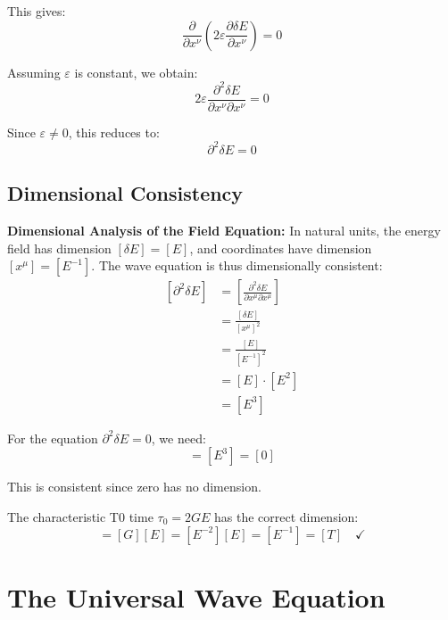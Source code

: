 \documentclass[12pt,a4paper]{report}
\begin{document}
This gives:
\begin{equation}
	\frac{\partial}{\partial x^\nu}\left(2\varepsilon \frac{\partial \delta E}{\partial x^\nu}\right) = 0
\end{equation}

Assuming $\varepsilon$ is constant, we obtain:
\begin{equation}
	2\varepsilon \frac{\partial^2 \delta E}{\partial x^\nu \partial x^\nu} = 0
\end{equation}

Since $\varepsilon \neq 0$, this reduces to:
\begin{equation}
	\partial^2 \delta E = 0
\end{equation}

\subsection{Dimensional Consistency}

\textbf{Dimensional Analysis of the Field Equation:}
In natural units, the energy field has dimension $[\delta E] = [E]$, and coordinates have dimension $[x^\mu] = [E^{-1}]$. The wave equation is thus dimensionally consistent:
\begin{align}
	\left[\partial^2 \delta E\right] &= \left[\frac{\partial^2 \delta E}{\partial x^\mu \partial x^\mu}\right] \\
	&= \frac{[\delta E]}{[x^\mu]^2} \\
	&= \frac{[E]}{[E^{-1}]^2} \\
	&= [E] \cdot [E^2] \\
	&= [E^3]
\end{align}

For the equation $\partial^2 \delta E = 0$, we need:
\begin{equation}
	[\partial^2 \delta E] = [E^3] = [0]
\end{equation}

This is consistent since zero has no dimension.

The characteristic T0 time $\tau_0 = 2GE$ has the correct dimension:
\begin{equation}
	[\tau_0] = [G][E] = [E^{-2}][E] = [E^{-1}] = [T] \quad \checkmark
\end{equation}

\section{The Universal Wave Equation}
\end{document}
